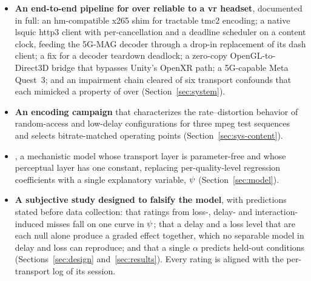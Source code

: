 \begin{itemize}[leftmargin=*,nosep]
  \item[--] \textbf{An end-to-end pipeline for \vpcc over reliable \quic
        to a \gls{vr} headset}, documented in full: an \gls{hm}-compatible
        x265 shim for tractable \gls{tmc2} encoding; a native lsquic
        \gls{http3} client with per-\gof cancellation and a deadline
        scheduler on a content clock, feeding the 5G-MAG decoder through a
        drop-in replacement of its \gls{dash} client; a fix for a decoder
        teardown deadlock; a zero-copy OpenGL-to-Direct3D bridge that
        bypasses Unity's OpenXR path; a 5G-capable Meta Quest~3; and an
        impairment chain cleared of six transport confounds that each
        mimicked a property of \vpcc over \quic (Section~\ref{sec:system}).
  \item[--] \textbf{An encoding campaign} that characterizes the
        rate--distortion behavior of random-access and low-delay
        configurations for three \gls{mpeg} test sequences and selects
        bitrate-matched operating points (Section~\ref{sec:sys-content}).
  \item[--] \textbf{\crystal}, a mechanistic model whose transport layer
        is parameter-free and whose perceptual layer has one constant,
        replacing per-quality-level regression coefficients with a
        single explanatory variable, $\psi$ (Section~\ref{sec:model}).
  \item[--] \textbf{A subjective study designed to falsify the model},
        with predictions stated before data collection: that ratings
        from loss-, delay- and interaction-induced misses fall on one
        curve in $\psi$; that a delay and a loss level that are each
        null alone produce a graded effect together, which no separable
        model in delay and loss can reproduce; and that a single
        $\alpha$ predicts held-out conditions
        (Sections~\ref{sec:design} and~\ref{sec:results}). Every rating
        is aligned with the per-\gof transport log of its session.
\end{itemize}

